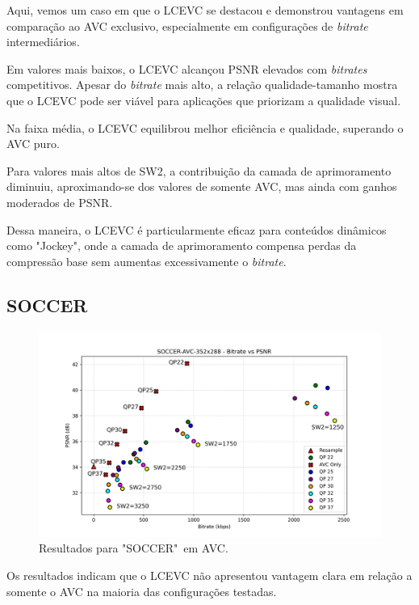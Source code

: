 Aqui, vemos um caso em que o \acrshort{LCEVC} se destacou e demonstrou vantagens
em comparação ao \acrshort{AVC} exclusivo, especialmente em configurações de 
\textit{bitrate} intermediários.

Em valores mais baixos, o \acrshort{LCEVC} alcançou \acrshort{PSNR} elevados
com \textit{bitrates} competitivos. Apesar do \textit{bitrate} mais alto,
a relação qualidade-tamanho mostra que o \acrshort{LCEVC} pode ser viável
para aplicações que priorizam a qualidade visual.

Na faixa média, o \acrshort{LCEVC} equilibrou melhor eficiência e qualidade,
superando o \acrshort{AVC} puro. 

Para valores mais altos de SW2, a contribuição da camada de aprimoramento
diminuiu, aproximando-se dos valores de somente \acrshort{AVC}, mas ainda
com ganhos moderados de \acrshort{PSNR}.

Dessa maneira, o \acrshort{LCEVC} é particularmente eficaz para conteúdos
dinâmicos como "Jockey", onde a camada de aprimoramento compensa perdas da
compressão base sem aumentas excessivamente o \textit{bitrate}.

\subsection{SOCCER}

\begin{figure}[h]
    \centering
    \includegraphics[width=1.0\textwidth]{img/SOCCER-AVC.png}
    \caption{Resultados para "SOCCER"\ em \acrshort{AVC}. \cite{xiph}}
    \label{fig:SOCCER}
\end{figure}

Os resultados indicam que o \acrshort{LCEVC} não apresentou vantagem clara em relação
a somente o \acrshort{AVC} na maioria das configurações testadas.

